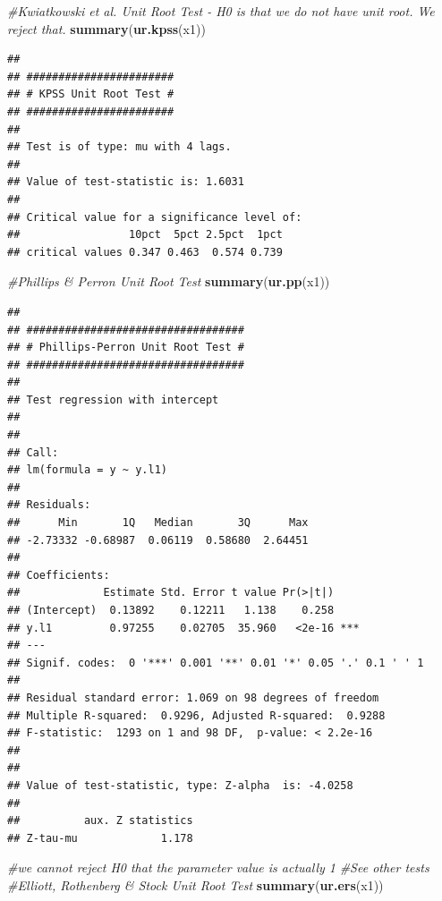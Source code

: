 \documentclass[]{book}
\newenvironment{Shaded}{\begin{snugshade}}{\end{snugshade}}
\newcommand{\CommentTok}[1]{\textcolor[rgb]{0.56,0.35,0.01}{\textit{#1}}}
\newcommand{\KeywordTok}[1]{\textcolor[rgb]{0.13,0.29,0.53}{\textbf{#1}}}
\newcommand{\NormalTok}[1]{#1}
\begin{document}
\begin{Shaded}
\begin{Highlighting}[]
\CommentTok{#Kwiatkowski et al. Unit Root Test - H0 is that we do not have unit root. We reject that.}
\KeywordTok{summary}\NormalTok{(}\KeywordTok{ur.kpss}\NormalTok{(x1))}
\end{Highlighting}
\end{Shaded}

\begin{verbatim}
## 
## ####################### 
## # KPSS Unit Root Test # 
## ####################### 
## 
## Test is of type: mu with 4 lags. 
## 
## Value of test-statistic is: 1.6031 
## 
## Critical value for a significance level of: 
##                 10pct  5pct 2.5pct  1pct
## critical values 0.347 0.463  0.574 0.739
\end{verbatim}

\begin{Shaded}
\begin{Highlighting}[]
\CommentTok{#Phillips & Perron Unit Root Test}
\KeywordTok{summary}\NormalTok{(}\KeywordTok{ur.pp}\NormalTok{(x1))}
\end{Highlighting}
\end{Shaded}

\begin{verbatim}
## 
## ################################## 
## # Phillips-Perron Unit Root Test # 
## ################################## 
## 
## Test regression with intercept 
## 
## 
## Call:
## lm(formula = y ~ y.l1)
## 
## Residuals:
##      Min       1Q   Median       3Q      Max 
## -2.73332 -0.68987  0.06119  0.58680  2.64451 
## 
## Coefficients:
##             Estimate Std. Error t value Pr(>|t|)    
## (Intercept)  0.13892    0.12211   1.138    0.258    
## y.l1         0.97255    0.02705  35.960   <2e-16 ***
## ---
## Signif. codes:  0 '***' 0.001 '**' 0.01 '*' 0.05 '.' 0.1 ' ' 1
## 
## Residual standard error: 1.069 on 98 degrees of freedom
## Multiple R-squared:  0.9296, Adjusted R-squared:  0.9288 
## F-statistic:  1293 on 1 and 98 DF,  p-value: < 2.2e-16
## 
## 
## Value of test-statistic, type: Z-alpha  is: -4.0258 
## 
##          aux. Z statistics
## Z-tau-mu             1.178
\end{verbatim}

\begin{Shaded}
\begin{Highlighting}[]
\CommentTok{#we cannot reject H0 that the parameter value is actually 1}
\CommentTok{#See other tests}
\CommentTok{#Elliott, Rothenberg & Stock Unit Root Test}
\KeywordTok{summary}\NormalTok{(}\KeywordTok{ur.ers}\NormalTok{(x1))}
\end{Highlighting}
\end{Shaded}
\end{document}
